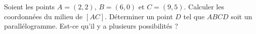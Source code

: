 
\begin{exercice}\label{exoSeconde-0011}

    Soient les points \( A=(2,2)\), \( B=(6,0)\) et \( C=(9,5)\). Calculer les coordonnées du milieu de \( [AC]\). Déterminer un point \( D\) tel que \( ABCD\) soit un parallélogramme. Est-ce qu'il y a plusieurs possibilités ?

\end{exercice}
